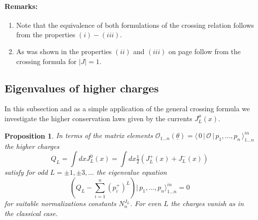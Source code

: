 \documentclass[a4paper,a4paper]{article}
\newtheorem{proposition}[theorem]{Proposition}
\begin{document}
\paragraph{Remarks:}

\begin{enumerate}
\item  Note that the equivalence of both formulations of the crossing
relation follows from the properties $(i)-(iii)$.

\item  As was shown in \cite{BFKZ} the properties $(ii)$ and $(iii)$ on page 
\pageref{p} follow from the crossing formula for $|J|=1$.
\end{enumerate}

\subsection{Eigenvalues of higher charges}

In this subsection and as a simple application of the general crossing
formula we investigate the higher conservation laws given by the currents $%
J_{L}^{\mu }(x)$.

\begin{proposition}
In terms of the matrix elements \newline
$\mathcal{O}_{1\dots n}(\underline{\theta })=\langle \,0\,|\,\mathcal{O}%
\,|\,p_{1},\dots ,p_{n}\,\rangle _{1\dots n}^{in}$ the higher charges 
\[
Q_{L}=\int dxJ_{L}^{0}(x)=\int dx\tfrac{1}{2}\left(
J_{L}^{+}(x)+J_{L}^{-}(x)\right) 
\]
satisfy for odd $L=\pm 1,\pm 3,\dots $ the eigenvalue equation 
\[
\left( Q_{L}-\sum_{i=1}^{n}\left( p_{i}^{+}\right) ^{L}\right)
|\,p_{1},\dots ,p_{n}\rangle _{1\dots n}^{in}=0 
\]
for suitable normalizations constants $N_{n}^{J_{L}}$. For even $L$ the
charges vanish as in the classical case.
\end{proposition}
\end{document}

